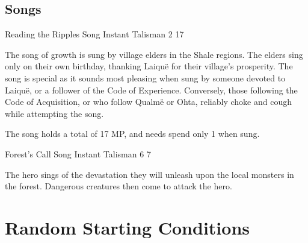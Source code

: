 \begin{multicols}{2}
\subsection{Songs}

\label{chokingsong}

	{Reading the Ripples}%
	{Song}%
	{Instant}%
	{Talisman}%
	{2}%
	{17}%

The song of growth is sung by village elders in the Shale regions.
The elders sing only on their own birthday, thanking Laiqu\"{e} for their village's prosperity.
The song is special as it sounds most pleasing when sung by someone devoted to Laiqu\"{e}, or a follower of the Code of Experience.
Conversely, those following the Code of Acquisition, or who follow Qualm\"{e} or Ohta, reliably choke and cough while attempting the song.

The song holds a total of 17 MP, and needs spend only 1 when sung.

	{Forest's Call}%
	{Song}%
	{Instant}%
	{Talisman}%
	{6}%
	{7}%

\label{medalofheroism}

The hero sings of the devastation they will unleash upon the local monsters in the forest.
Dangerous creatures then come to attack the hero.

\end{multicols}

\section{Random Starting Conditions}

